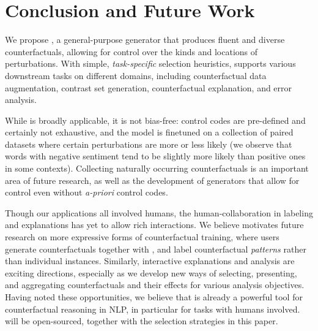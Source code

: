 \section{Conclusion and Future Work}
\label{sec:discuss}

We propose \sysname, a general-purpose generator that produces fluent and diverse counterfactuals, allowing for control over the kinds and locations of perturbations. 
With simple, \emph{task-specific} selection heuristics, \sysname supports various downstream tasks on different domains, including counterfactual data augmentation, contrast set generation, counterfactual explanation, and error analysis.

While \sysname is broadly applicable, it is not bias-free: control codes are pre-defined and certainly not exhaustive, and the model is finetuned on a collection of paired datasets where certain perturbations are more or less likely (\eg we observe that words with negative sentiment tend to be slightly more likely than positive ones in some contexts). 
Collecting naturally occurring counterfactuals is an important area of future research, as well as the development of generators that allow for control even without \emph{a-priori} control codes.

Though our applications all involved humans, the human-\sysname collaboration in labeling and explanations has yet to allow rich interactions. 
We believe \sysname motivates future research on more expressive forms of counterfactual training, where users generate counterfactuals together with \sysname, and label counterfactual \emph{patterns} rather than individual instances. 
Similarly, interactive explanations and analysis are exciting directions, especially as we develop new ways of selecting, presenting, and aggregating counterfactuals and their effects for various analysis objectives.
Having noted these opportunities, we believe that \sysname is already a powerful tool for counterfactual reasoning in NLP, in particular for tasks with humans involved. 
\sysname will be open-sourced, together with the selection strategies in this paper.



